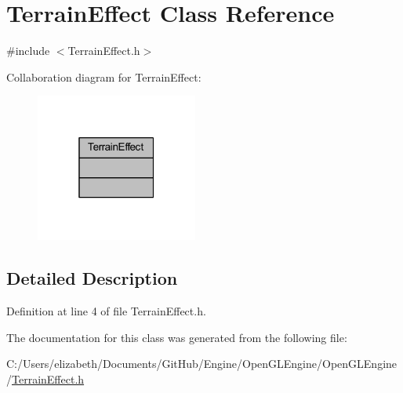 \hypertarget{class_terrain_effect}{}\section{Terrain\+Effect Class Reference}
\label{class_terrain_effect}


{\ttfamily \#include $<$Terrain\+Effect.\+h$>$}



Collaboration diagram for Terrain\+Effect\+:\nopagebreak
\begin{figure}[H]
\begin{center}
\leavevmode
\includegraphics[width=151pt]{class_terrain_effect__coll__graph}
\end{center}
\end{figure}


\subsection{Detailed Description}


Definition at line 4 of file Terrain\+Effect.\+h.



The documentation for this class was generated from the following file\+:\begin{DoxyCompactItemize}
\item 
C\+:/\+Users/elizabeth/\+Documents/\+Git\+Hub/\+Engine/\+Open\+G\+L\+Engine/\+Open\+G\+L\+Engine/\hyperlink{_terrain_effect_8h}{Terrain\+Effect.\+h}\end{DoxyCompactItemize}
